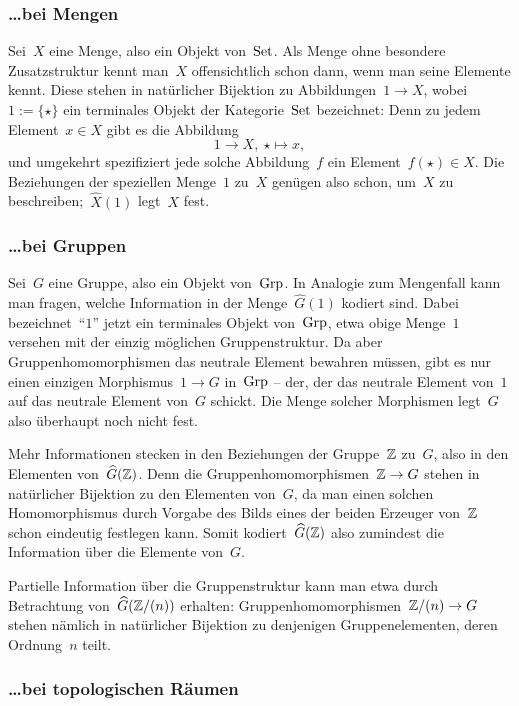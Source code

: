 \subsubsection*{\ldots bei Mengen}

Sei~$X$ eine Menge, also ein Objekt von~$\mathrm{Set}$. Als Menge ohne besondere
Zusatzstruktur kennt man~$X$ offensichtlich schon dann, wenn man seine Elemente
kennt. Diese stehen in natürlicher Bijektion zu Abbildungen~$1 \to X$, wobei~$1
:= \{ \star \}$ ein terminales Objekt der Kategorie~$\mathrm{Set}$ bezeichnet: Denn zu
jedem Element~$x \in X$ gibt es die Abbildung
\[ 1 \longrightarrow X,\ \star \longmapsto x, \]
und umgekehrt spezifiziert jede solche Abbildung~$f$ ein Element~$f(\star) \in X$.
Die Beziehungen der speziellen Menge~$1$ zu~$X$ genügen also schon, um~$X$ zu
beschreiben;~$\widehat X(1)$ legt~$X$ fest.


\subsubsection*{\ldots bei Gruppen}

Sei~$G$ eine Gruppe, also ein Objekt von~$\mathrm{Grp}$. In Analogie zum
Mengenfall kann man fragen, welche Information in der Menge~$\widehat G(1)$
kodiert sind. Dabei bezeichnet~"`$1$"' jetzt ein terminales Objekt von~$\mathrm{Grp}$,
etwa obige Menge~$1$ versehen mit der einzig möglichen Gruppenstruktur. Da aber
Gruppenhomomorphismen das neutrale Element bewahren müssen, gibt es nur einen
einzigen Morphismus~$1 \to G$ in~$\mathrm{Grp}$ -- der, der das neutrale Element von~$1$ auf das
neutrale Element von~$G$ schickt. Die Menge solcher Morphismen legt~$G$ also überhaupt
noch nicht fest.

Mehr Informationen stecken in den Beziehungen der Gruppe~$\mathbb{Z}$ zu~$G$, also in
den Elementen von~$\widehat G(\mathbb{Z})$. Denn die Gruppenhomomorphismen~$\mathbb{Z} \to G$
stehen in natürlicher Bijektion zu den Elementen von~$G$, da man einen solchen
Homomorphismus durch Vorgabe des Bilds eines der beiden Erzeuger von~$\mathbb{Z}$
schon eindeutig festlegen kann. Somit kodiert~$\widehat G(\mathbb{Z})$ also zumindest
die Information über die Elemente von~$G$.

Partielle Information über die Gruppenstruktur kann man etwa durch Betrachtung
von~$\widehat G(\mathbb{Z}/(n))$ erhalten: Gruppenhomomorphismen~$\mathbb{Z}/(n) \to G$
stehen nämlich in natürlicher Bijektion zu denjenigen Gruppenelementen, deren
Ordnung~$n$ teilt.


\subsubsection*{\ldots bei topologischen Räumen}

